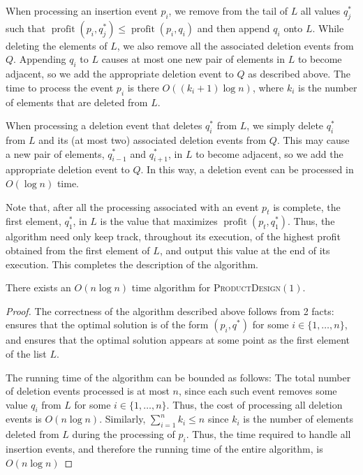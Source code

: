 \documentclass[lotsofwhite]{patmorin}
\newcommand{\val}{\operatorname{profit}}
\begin{document}
When processing an insertion event $p_i$, we remove from the tail of $L$
all values $q_j^*$ such that $\val(p_i,q_j^*) \le \val(p_i,q_i)$ and
then append $q_i$ onto $L$.  While deleting the elements of $L$, we also
remove all the associated deletion events from $Q$.  Appending $q_i$ to
$L$ causes at most one new pair of elements in $L$ to become adjacent,
so we add the appropriate deletion event to $Q$ as described above.
The time to process the event $p_i$ is there $O((k_i+1)\log n)$, where $k_i$ is
the number of elements that are deleted from $L$.

When processing a deletion event that deletes $q_i^*$ from $L$, we
simply delete $q_i^*$ from $L$ and its (at most two) associated deletion
events from $Q$.  This may cause a new pair of elements, $q_{i-1}^*$
and $q_{i+1}^*$, in $L$ to become adjacent, so we add the appropriate
deletion event to $Q$. In this way, a deletion event can be processed
in $O(\log n)$ time.

Note that, after all the processing associated with an event $p_t$ is
complete, the first element, $q_1^*$, in $L$ is the value that maximizes
$\val(p_{t},q_1^*)$. Thus, the algorithm need only keep track, throughout
its execution, of the highest profit obtained from the first element of
$L$, and output this value at the end of its execution.  This completes
the description of the algorithm.

\begin{thm}
  There exists an $O(n\log n)$ time algorithm for
  \textsc{ProductDesign$(1)$}.
\end{thm}

\begin{proof}
  The correctness of the algorithm described above follows from 2 facts:
   ensures that the optimal solution is of the form
  $(p_i,q^*)$ for some $i\in\{1,\ldots,n\}$, and 
  ensures that the optimal solution appears at some point as the first
  element of the list $L$.

  The running time of the algorithm can be bounded as follows:
  The total number of deletion events processed is at most $n$,
  since each such event removes some value $q_i$ from $L$ for some
  $i\in\{1,\ldots,n\}$. Thus, the cost of processing all deletion events
  is $O(n\log n)$.  Similarly, $\sum_{i=1}^n k_i \le n$ since $k_i$
  is the number of elements deleted from $L$ during the processing of
  $p_i$. Thus, the time required to handle all insertion events, and
  therefore the running time of the entire algorithm, is $O(n\log n)$
\end{proof}
\end{document}
